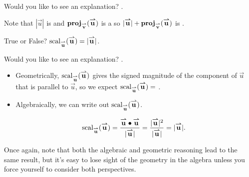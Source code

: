 \documentclass{ximera}
\begin{document}
\begin{exercise}
\begin{selectAll}
\begin{hint}
\begin{problem}
Would you like to see an explanation?
.

\begin{question}
Note that $|\vec{u}|$ is   and $\proj_\vec{v}(\vec{u})$ is a  so  $|\vec{u}|+\proj_\vec{v}(\vec{u})$ is .
\end{question}
\end{problem}
\begin{problem}
True or False?  $\scal_\vec{u}(\vec{u}) = |\vec{u}|$.

Would you like to see an explanation?
.

\begin{question}
\begin{itemize}
\item Geometrically, $\scal_\vec{u}(\vec{u})$ gives the signed magnitude of the component of $\vec{u}$ that is parallel to $\vec{u}$, so we expect $\scal_\vec{u}(\vec{u})=$ .

\item Algebraically, we can write out $\scal_\vec{u}(\vec{u})$.

\[
\scal_\vec{u}(\vec{u}) = \frac{\vec{u} \dotp \vec{u}}{|\vec{u}|} =  \frac{|\vec{u}|^2}{|\vec{u}|} = |\vec{u}|.
\]

\end{itemize}

Once again, note that both the algebraic and geometric reasoning lead to the same result, but it's easy to lose sight of the geometry in the algebra unless you force yourself to consider both perspectives.
\end{question}
\end{problem}





\end{hint}
\end{selectAll}
\end{exercise}
\end{document}
